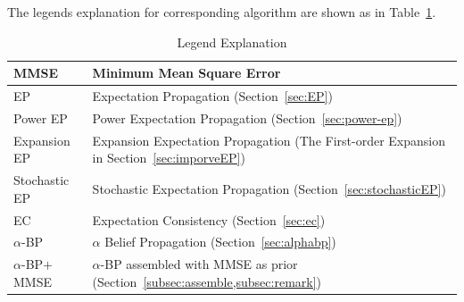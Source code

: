 \documentclass{article}
\begin{document}
The legends explanation for corresponding algorithm are shown as in Table~\ref{tab:lagend}.
\begin{table}[h]
  \caption{Legend Explanation}\label{tab:lagend}
  \centering
  \begin{tabular}{ |p{3cm}||p{8cm}|  }
    \hline
    MMSE   & Minimum Mean Square Error \\
    \hline
    EP   & Expectation Propagation (Section~\ref{sec:EP}) \\
    \hline
    Power EP & Power Expectation Propagation (Section~\ref{sec:power-ep}) \\
    \hline
    Expansion EP & Expansion Expectation Propagation (The First-order Expansion in Section~\ref{sec:imporveEP}) \\
    Stochastic EP & Stochastic Expectation Propagation (Section~\ref{sec:stochasticEP}) \\
    \hline
    EC & Expectation Consistency (Section~\ref{sec:ec}) \\
    \hline
    $\alpha$-BP & $\alpha$ Belief Propagation (Section~\ref{sec:alphabp}) \\
    \hline
    $\alpha$-BP$+$MMSE & $\alpha$-BP assembled with MMSE as prior (Section~\ref{subsec:assemble,subsec:remark}) \\
  \end{tabular}
\end{table}



\end{document}

